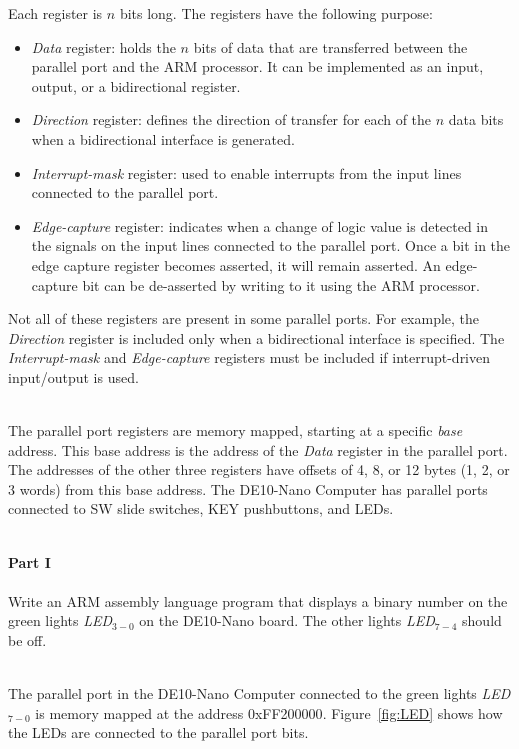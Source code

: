 \documentclass[epsfig,10pt,fullpage]{article}
\begin{document}
\noindent
Each register is $n$ bits long. The registers have the following purpose:
\begin{itemize}
\item {\it Data} register: holds the $n$ bits of data that are transferred between the parallel 
port and the ARM processor. It can be implemented as an input, output, or a bidirectional register.
\item {\it Direction} register: defines the direction of transfer for each of the $n$
data bits when a bidirectional interface is generated.
\item {\it Interrupt-mask} register: used to enable interrupts from the
input lines connected to the parallel port.
\item {\it Edge-capture} register: indicates when a change of logic value is detected in 
the signals on the input lines connected to the parallel port. Once a bit in the edge
capture register becomes asserted, it will remain asserted. An edge-capture bit can be
de-asserted by writing to it using the ARM processor.
\end{itemize}
\noindent
Not all of these registers are present in some parallel ports. For example,
the {\it Direction} register is included only when a bidirectional interface is specified.
The {\it Interrupt-mask} and {\it Edge-capture} registers must be included if
interrupt-driven input/output is used.

~\\
The parallel port registers are memory mapped, starting at a specific {\it base} address.
This base address is the address of the {\it Data} 
register in the parallel port. The addresses of the other three registers have offsets 
of 4, 8, or 12 bytes (1, 2, or 3 words) from this base address. The DE10-Nano Computer has 
parallel ports connected to SW slide switches, KEY pushbuttons, and LEDs.

~\\
\noindent
{\bf Part I}
~\\
~\\
\noindent
Write an ARM assembly language program that displays a binary number on the green 
lights {\it LED}$_{3-0}$ on the DE10-Nano board. The other lights {\it LED}$_{7-4}$
should be off. 

~\\
\noindent
The parallel port in the DE10-Nano Computer connected to the green lights
{\it LED}$_{7-0}$ is memory mapped at the address {\sf 0xFF200000}. 
Figure~\ref{fig:LED} shows how the LEDs are connected to the parallel port bits.  
\end{document}
